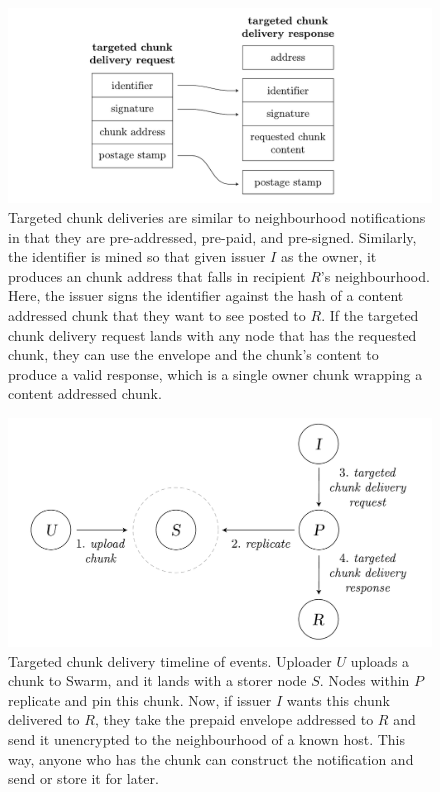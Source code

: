 \begin{figure}[htbp]
\centering
\includegraphics[width=\textwidth]{fig/targeted-chunk-delivery.pdf}      
\caption[Targeted chunk deliveries \statusgreen]{Targeted chunk deliveries are similar to neighbourhood notifications in that they are pre-addressed, pre-paid, and pre-signed. Similarly, the identifier is mined so that given issuer $I$ as the owner, it produces an chunk address that falls in recipient $R$'s neighbourhood. Here, the issuer signs the identifier against the hash of a content addressed chunk that they want to see posted to $R$. If the targeted chunk delivery request lands with any node that has the requested chunk, they can use the envelope and the chunk's content to produce a valid response, which is a single owner chunk wrapping a content addressed chunk.}
\label{fig:targeted-chunk-delivery}
\end{figure}

\begin{figure}[htbp]
\centering
\includegraphics[width=.8\textwidth]{fig/targeted-chunk-delivery-events.pdf}
\caption[Targeted chunk delivery timeline of events\statusgreen]{Targeted chunk delivery timeline of events. Uploader $U$ uploads a chunk to Swarm, and it lands with a storer node $S$. Nodes within $P$ replicate and pin this chunk. Now, if issuer $I$ wants this chunk delivered to $R$, they take the prepaid envelope addressed to $R$ and send it unencrypted to the neighbourhood of a known host. This way, anyone who has the chunk can construct the notification and send or store it for later.}
\label{fig:targeted-chunk-delivery-events}
\end{figure}



